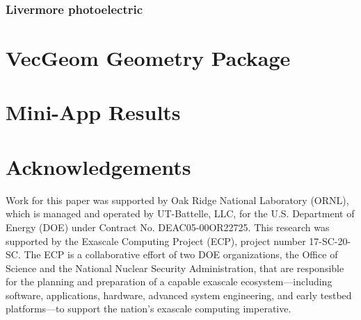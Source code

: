\documentclass{webofc}
\begin{document}
\subsubsection{Livermore photoelectric}


\section{VecGeom Geometry Package}
\label{sec:vecgeom}

\section{Mini-App Results}
\label{sec:miniapp}

\section{Acknowledgements}

Work for this paper was supported by Oak Ridge National Laboratory (ORNL), which is managed and operated by UT-Battelle, LLC, for the U.S. Department of Energy (DOE) under Contract No. DEAC05-00OR22725.
This research was supported by the Exascale Computing
Project (ECP), project number 17-SC-20-SC. The ECP is a collaborative effort of
two DOE organizations, the Office of Science and the National Nuclear Security
Administration, that are responsible for the planning and preparation of a
capable exascale ecosystem---including software, applications, hardware,
advanced system engineering, and early testbed platforms---to support the
nation's exascale computing imperative.


\end{document}
